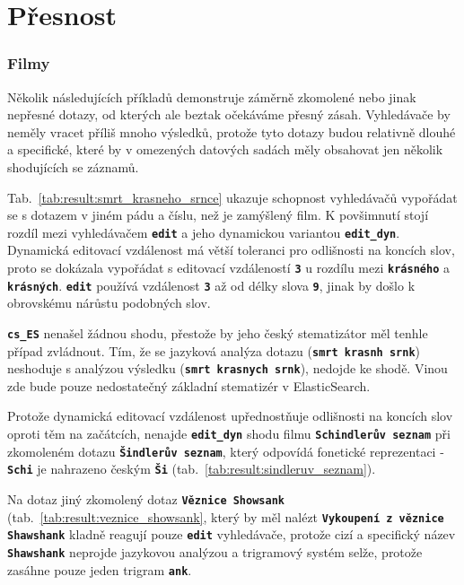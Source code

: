 \documentclass[11pt,letterpaper,oneside,openright]{book}
\newcommand{\bftt}[1]{\texttt{\textbf{#1}}}
\begin{document}
\section{Přesnost}
\subsubsection{Filmy}
Několik následujících příkladů demonstruje záměrně zkomolené nebo jinak
nepřesné dotazy, od kterých ale beztak očekáváme přesný zásah.
Vyhledávače by neměly vracet příliš mnoho výsledků, protože tyto dotazy
budou relativně dlouhé a specifické, které by v omezených datových
sadách měly obsahovat jen několik shodujících se záznamů.

\mbox{}\mbox{}

Tab.~\ref{tab:result:smrt_krasneho_srnce} ukazuje schopnost vyhledávačů
vypořádat se s dotazem v jiném pádu a číslu, než je zamýšlený film. K
povšimnutí stojí rozdíl mezi vyhledávačem \bftt{edit} a jeho dynamickou
variantou \bftt{edit\_dyn}. Dynamická editovací vzdálenost má větší toleranci
pro odlišnosti na koncích slov, proto se dokázala vypořádat s editovací
vzdáleností \bftt{3} u rozdílu mezi \bftt{krásného} a \bftt{krásných}.
\bftt{edit} používá vzdálenost \bftt{3} až od délky slova \bftt{9}, jinak by
došlo k obrovskému nárůstu podobných slov.

\bftt{cs\_ES} nenašel žádnou shodu, přestože by jeho český stematizátor měl
tenhle případ zvládnout. Tím, že se jazyková analýza dotazu
(\bftt{smrt~krasnh~srnk}) neshoduje s analýzou výsledku
(\bftt{smrt~krasnych~srnk}), nedojde ke shodě. Vinou zde bude pouze
nedostatečný základní stematizér v ElasticSearch.

\mbox{}\mbox{}

Protože dynamická editovací vzdálenost upřednostňuje odlišnosti na
koncích slov oproti těm na začátcích, nenajde \bftt{edit\_dyn} shodu
filmu \bftt{Schindlerův seznam} při zkomoleném dotazu \bftt{Šindlerův
seznam}, který odpovídá fonetické reprezentaci - \bftt{Schi} je
nahrazeno českým \bftt{Ši} (tab.~\ref{tab:result:sindleruv_seznam}).

\mbox{}\mbox{}

Na dotaz jiný zkomolený dotaz \bftt{Věznice Showsank}
(tab.~\ref{tab:result:veznice_showsank}, který by měl nalézt
\bftt{Vykoupení z věznice Shawshank} kladně reagují pouze \bftt{edit}
vyhledávače, protože cizí a specifický název \bftt{Shawshank} neprojde
jazykovou analýzou a trigramový systém selže, protože zasáhne pouze jeden
trigram \bftt{ank}.
\end{document}
